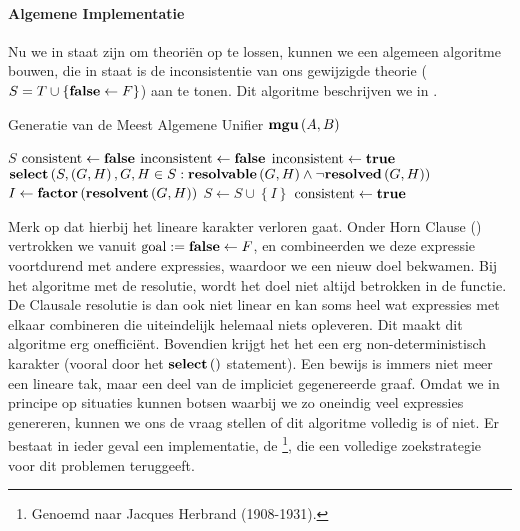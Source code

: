 \paragraph{Algemene Implementatie}
Nu we in staat zijn om theori\"en op te lossen, kunnen we een algemeen algoritme bouwen, die in staat is de inconsistentie van ons gewijzigde theorie ($S=T\cup\left\{\mbox{\bf false}\leftarrow F\right\}$) aan te tonen. Dit algoritme beschrijven we in .
\begin{algorithm}[htb]                      %
\caption{Generatie van de Meest Algemene Unifier $\mbox{\bf mgu}\left( A,B \right)$}          %
\label{alg:resolutionSolver}                           %
\begin{algorithmic}[1]                    %
\REQUIRE$S$
\STATE $\mbox{consistent}\leftarrow\mbox{\bf false}$
\STATE $\mbox{inconsistent}\leftarrow\mbox{\bf false}$
\WHILE{$\neg\consistent\wedge\neg\inconsistent$}
\STATE$\mbox{inconsistent}\leftarrow\mbox{\bf true}$
\STATE$\mbox{\bf select}\left( S,\left(G,H\right),G,H\in S:\mbox{\bf resolvable}\left( G,H \right)\wedge\neg\mbox{\bf resolved}\left( G,H \right) \right)$
\STATE$I\leftarrow\mbox{\bf factor}\left( \mbox{\bf resolvent}\left( G,H \right) \right)$
\STATE$S\leftarrow S\cup\left\{I\right\}$
\ELSE
\STATE$\mbox{consistent}\leftarrow\mbox{\bf true}$
\ENDIF
\ENDWHILE
\end{algorithmic}
\end{algorithm}
Merk op dat hierbij het lineare karakter verloren gaat. Onder Horn Clause () vertrokken we vanuit $\mbox{goal}:=\mbox{\bf false}\leftarrow F$, en combineerden we deze expressie voortdurend met andere expressies, waardoor we een nieuw doel bekwamen. Bij het algoritme met de resolutie, wordt het doel niet altijd betrokken in de functie. De Clausale resolutie is dan ook niet linear en kan soms heel wat expressies met elkaar combineren die uiteindelijk helemaal niets opleveren. Dit maakt dit algoritme erg oneffici\"ent. Bovendien krijgt het het een erg non-deterministisch karakter (vooral door het $\mbox{\bf select}\left(  \right)$ statement). Een bewijs is immers niet meer een lineare tak, maar een deel van de impliciet gegenereerde graaf. Omdat we in principe op situaties kunnen botsen waarbij we zo oneindig veel expressies genereren, kunnen we ons de vraag stellen of dit algoritme volledig is of niet. Er bestaat in ieder geval een implementatie, de \footnote{Genoemd naar Jacques Herbrand (1908-1931).}, die een volledige zoekstrategie voor dit problemen teruggeeft.
